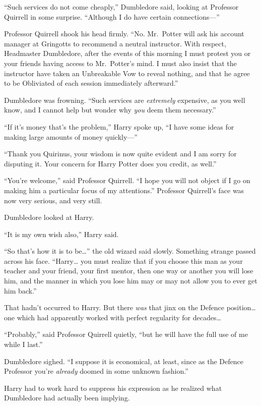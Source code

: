 ``Such services do not come cheaply,'' Dumbledore said, looking at
Professor Quirrell in some surprise. ``Although I do have certain
connections---''

Professor Quirrell shook his head firmly. ``No. Mr.~Potter will ask his
account manager at Gringotts to recommend a neutral instructor. With
respect, Headmaster Dumbledore, after the events of this morning I must
protest you or your friends having access to Mr.~Potter's mind. I must
also insist that the instructor have taken an Unbreakable Vow to reveal
nothing, and that he agree to be Obliviated of each session immediately
afterward.''

Dumbledore was frowning. ``Such services are \emph{extremely} expensive,
as you well know, and I cannot help but wonder why \emph{you} deem them
necessary.''

``If it's money that's the problem,'' Harry spoke up, ``I have some
ideas for making large amounts of money quickly---''

``Thank you Quirinus, your wisdom is now quite evident and I am sorry
for disputing it. Your concern for Harry Potter does you credit, as
well.''

``You're welcome,'' said Professor Quirrell. ``I hope you will not
object if I go on making him a particular focus of my attentions.''
Professor Quirrell's face was now very serious, and very still.

Dumbledore looked at Harry.

``It is my own wish also,'' Harry said.

``So that's how it is to be\ldots{}'' the old wizard said slowly.
Something strange passed across his face. ``Harry\ldots{} you must
realize that if you choose this man as your teacher and your friend,
your first mentor, then one way or another you will lose him, and the
manner in which you lose him may or may not allow you to ever get him
back.''

That hadn't occurred to Harry. But there \emph{was} that jinx on the
Defence position\ldots{} one which had apparently worked with perfect
regularity for decades\ldots{}

``Probably,'' said Professor Quirrell quietly, ``but he will have the
full use of me while I last.''

Dumbledore sighed. ``I suppose it is economical, at least, since as the
Defence Professor you're \emph{already} doomed in some unknown
fashion.''

Harry had to work hard to suppress his expression as he realized what
Dumbledore had actually been implying.

